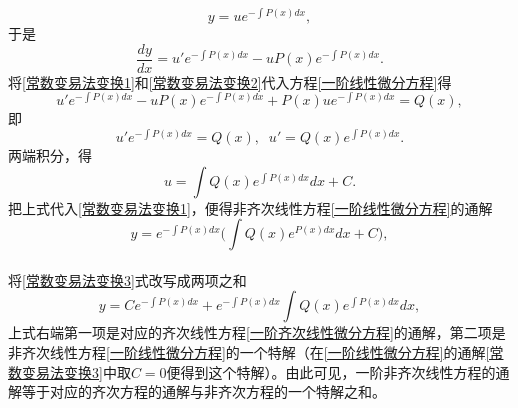 \begin{equation}
  \label{常数变易法变换1}
  y = ue^{-\int P(x)dx},
\end{equation}
于是
\begin{equation}
  \label{常数变易法变换2}
  \frac{dy}{dx} = u'e^{-\int P(x)dx} - uP(x)e^{-\int P(x)dx}.
\end{equation}
将\eqref{常数变易法变换1}和\eqref{常数变易法变换2}代入方程\eqref{一阶线性微分方程}得
\begin{equation*}
  u'e^{-\int P(x)dx} - uP(x)e^{-\int P(x)dx} + P(x)ue^{-\int P(x)dx} = Q(x),
\end{equation*}
即
\begin{equation*}
  u'e^{-\int P(x)dx} = Q(x), \;\; u' = Q(x)e^{\int P(x)dx}.
\end{equation*}
两端积分，得
\begin{equation*}
  u=\int Q(x)e^{\int P(x)dx}dx + C.
\end{equation*}
把上式代入\eqref{常数变易法变换1}，便得非齐次线性方程\eqref{一阶线性微分方程}的通解
\begin{equation}
  \label{常数变易法变换3}
  y = e^{-\int P(x)dx}\big( \int Q(x)e^{P(x)dx}dx + C \big),
\end{equation}

\paragraph{}
将\eqref{常数变易法变换3}式改写成两项之和
\begin{equation*}
  y = Ce^{-\int P(x)dx} + e^{-\int P(x)dx}\int Q(x)e^{\int P(x)dx}dx,
\end{equation*}
上式右端第一项是对应的齐次线性方程\eqref{一阶齐次线性微分方程}的通解，第二项是非齐次线性方程\eqref{一阶线性微分方程}的一个特解（在\eqref{一阶线性微分方程}的通解\eqref{常数变易法变换3}中取$C=0$便得到这个特解）。由此可见，一阶非齐次线性方程的通解等于对应的齐次方程的通解与非齐次方程的一个特解之和。
